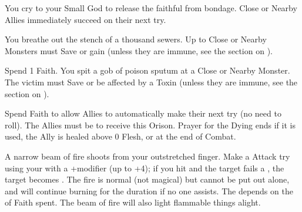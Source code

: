 \begin{multicols*}{2}
\LITURGY [
  Name = On Your Feet,
  Link = arcana-mystery-on-your-feet,
  Paradigm = Errant,
  Duration=1 Combat Action
]

You cry to your Small God to release the faithful from bondage. \DICE Close or Nearby Allies immediately succeed on their next \Duration try.

\LITURGY [
  Name = Pestilential Breath,
  Link = arcana-mystery-pestilential-breath,
  Paradigm = Civilized,
  Duration=1 Combat Action
]

You breathe out the stench of a thousand sewers. Up to \DICE Close or Nearby Monsters must Save or gain  (unless they are immune, see the section on ).

\LITURGY [
  Name = Poison Spittle,
  Link = arcana-mystery-poison-spittle,
  Paradigm = Monstrous,
  Duration=1 Combat Action
]

Spend 1 Faith. You spit a gob of poison sputum at a Close or Nearby Monster. The victim must Save or be affected by a  Toxin (unless they are immune, see the section on ).

\LITURGY [
  Name = Prayer for the Dying,
  Link = arcana-mystery-prayer-dying,
  Paradigm = J{\UmlautO}tnar,
  Duration=1 Combat Action
]

Spend \DICE Faith to allow \DICE Allies to automatically make their next \DEATH try (no need to roll). The Allies must be  to receive this Orison. Prayer for the Dying ends if it is used, the Ally is healed above 0 Flesh, or at the end of Combat. 

\LITURGY [
  Name = Ray of Fire,
  Link = arcana-mystery-ray-of-fire,
  Paradigm = J{\UmlautO}tnar,
  Duration=1 Combat Action
]

A narrow beam of fire shoots from your outstretched finger.  Make a Attack try using your \FOC with a +\DICE modifier (up to +4); if you hit and the target fails a , the target becomes . The fire is normal (not magical) but cannot be put out alone, and  will continue burning for the duration if no one assists. The \Duration depends on the \DICE of Faith spent. The beam of fire will also light flammable things alight.

\LITURGY [
  Name = Resonating Command,
  Link = arcana-mystery-resonating-command,
  Paradigm = Righteous,
  Duration=1 Combat Action
]


\end{multicols*}

